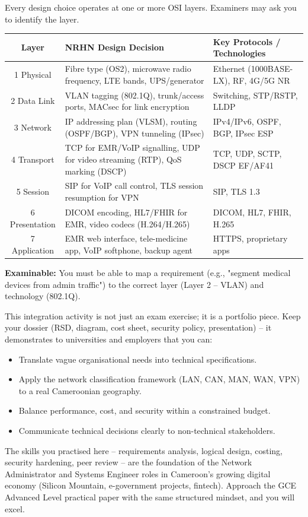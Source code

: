 \documentclass[11pt]{article}
\newcommand{\cle}[1]{{\popxbold\color{popdark}#1}}
\newcounter{popsec}
\newcounter{popsub}
\newcommand{\courssub}[1]{%
  \stepcounter{popsub}%
  \par\vspace{9pt}\noindent{\popxbold\fontsize{11.5}{13}\selectfont\color{popink}{\color{poporange}\thepopsec.\thepopsub}\hspace{6pt}#1}\par\nopagebreak\vspace{4pt}
}
\begin{document}
\begin{propriete}
Every design choice operates at one or more OSI layers. Examiners may ask you to identify the layer.
\begin{center}
\begin{tabularx}{\linewidth}{|c|X|X|}\hline
\textbf{Layer} & \textbf{NRHN Design Decision} & \textbf{Key Protocols / Technologies} \\ \hline
1 Physical & Fibre type (OS2), microwave radio frequency, LTE bands, UPS/generator & Ethernet (1000BASE-LX), RF, 4G/5G NR \\ \hline
2 Data Link & VLAN tagging (802.1Q), trunk/access ports, MACsec for link encryption & Switching, STP/RSTP, LLDP \\ \hline
3 Network & IP addressing plan (VLSM), routing (OSPF/BGP), VPN tunneling (IPsec) & IPv4/IPv6, OSPF, BGP, IPsec ESP \\ \hline
4 Transport & TCP for EMR/VoIP signalling, UDP for video streaming (RTP), QoS marking (DSCP) & TCP, UDP, SCTP, DSCP EF/AF41 \\ \hline
5 Session & SIP for VoIP call control, TLS session resumption for VPN & SIP, TLS 1.3 \\ \hline
6 Presentation & DICOM encoding, HL7/FHIR for EMR, video codecs (H.264/H.265) & DICOM, HL7, FHIR, H.265 \\ \hline
7 Application & EMR web interface, tele-medicine app, VoIP softphone, backup agent & HTTPS, proprietary apps \\ \hline
\end{tabularx}
\end{center}
\textbf{Examinable:} You must be able to map a requirement (e.g., "segment medical devices from admin traffic") to the correct layer (Layer 2 – VLAN) and technology (802.1Q).
\end{propriete}

\courssub{Final Reflection}

This integration activity is not just an exam exercise; it is a portfolio piece. Keep your dossier (RSD, diagram, cost sheet, security policy, presentation) – it demonstrates to universities and employers that you can:
\begin{itemize}
    \item Translate vague organisational needs into technical specifications.
    \item Apply the network classification framework (LAN, CAN, MAN, WAN, VPN) to a real Cameroonian geography.
    \item Balance performance, cost, and security within a constrained budget.
    \item Communicate technical decisions clearly to non-technical stakeholders.
\end{itemize}
The skills you practised here – requirements analysis, logical design, costing, security hardening, peer review – are the foundation of the \cle{Network Administrator} and \cle{Systems Engineer} roles in Cameroon's growing digital economy (Silicon Mountain, e-government projects, fintech). Approach the GCE Advanced Level practical paper with the same structured mindset, and you will excel.
\end{document}
